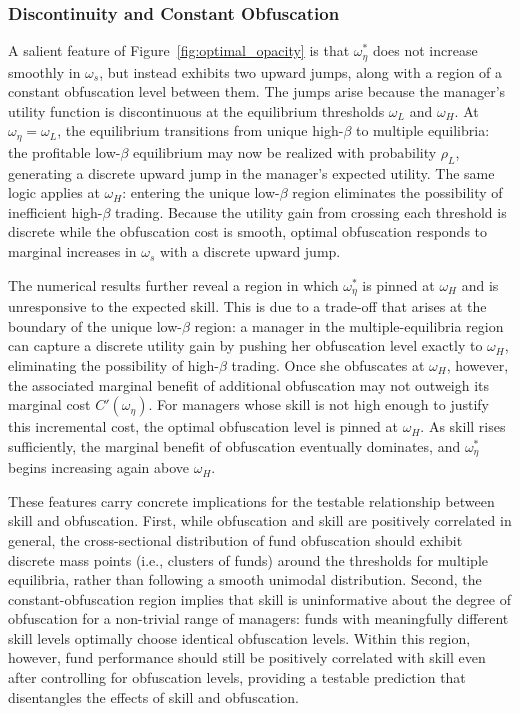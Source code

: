 \subsubsection{Discontinuity and Constant Obfuscation}
A salient feature of Figure~\ref{fig:optimal_opacity} is that $\omega_{\eta}^{*}$
does not increase smoothly in $\omega_s$, but instead exhibits two upward jumps,
along with a region of a constant obfuscation level between them.  The jumps arise because the
manager's utility function is discontinuous at the equilibrium thresholds $\omega_L$
and $\omega_H$.  At $\omega_{\eta} = \omega_L$, the equilibrium transitions from
unique high-$\beta$ to multiple equilibria: the profitable low-$\beta$ equilibrium
may now be realized with probability $\rho_L$, generating a discrete upward jump
in the manager's expected utility. The same logic applies at $\omega_H$: entering the unique
low-$\beta$ region eliminates the possibility of inefficient high-$\beta$
trading.  Because the utility gain from crossing each threshold is discrete while the obfuscation cost is smooth, optimal obfuscation responds to marginal increases in $\omega_s$
with a discrete upward jump.

The numerical results further reveal a region in which $\omega_\eta^*$ is
pinned at $\omega_H$ and is unresponsive to the expected skill.  This is due to a trade-off that arises at the boundary of the unique low-$\beta$ region: a manager in the
multiple-equilibria region can capture a discrete utility gain by pushing
her obfuscation level exactly to $\omega_H$, eliminating the possibility of
high-$\beta$ trading.  Once she obfuscates at $\omega_H$, however, the associated marginal benefit of additional obfuscation may not outweigh its marginal cost $C'(\omega_{\eta})$. For managers whose skill is not high enough to justify this
incremental cost, the optimal obfuscation level is pinned at $\omega_H$.  As skill rises sufficiently, the marginal benefit of
obfuscation eventually dominates, and $\omega_\eta^*$ begins increasing again above
$\omega_H$.

These features carry concrete implications for the testable relationship between skill and obfuscation.  First, while obfuscation and skill are positively correlated in general, the cross-sectional distribution of fund obfuscation should exhibit discrete mass points (i.e., clusters of funds) around the thresholds for multiple equilibria, rather than following a smooth unimodal distribution. Second, the constant-obfuscation region implies that skill is uninformative about the degree of obfuscation for a non-trivial range of managers: funds with meaningfully different skill levels optimally choose identical obfuscation levels. Within this region, however, fund performance should still be positively correlated with skill even after controlling for obfuscation levels, providing a testable prediction that disentangles the effects of skill and obfuscation.